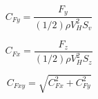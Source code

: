 \documentclass{ctexart}
\begin{document}
\begin{equation}
	C_{Fy}=\frac{F_y}{(1/2)\rho V_H^2 S_v}
\end{equation}

\begin{equation}
	C_{Fx}=\frac{F_z}{(1/2)\rho V_H^2 S_z}
\end{equation}

\begin{equation}
	C_{Fxy}=\sqrt{C_{Fx}^2+C_{Fy}^2}
\end{equation}




\printbibliography
\end{document}
